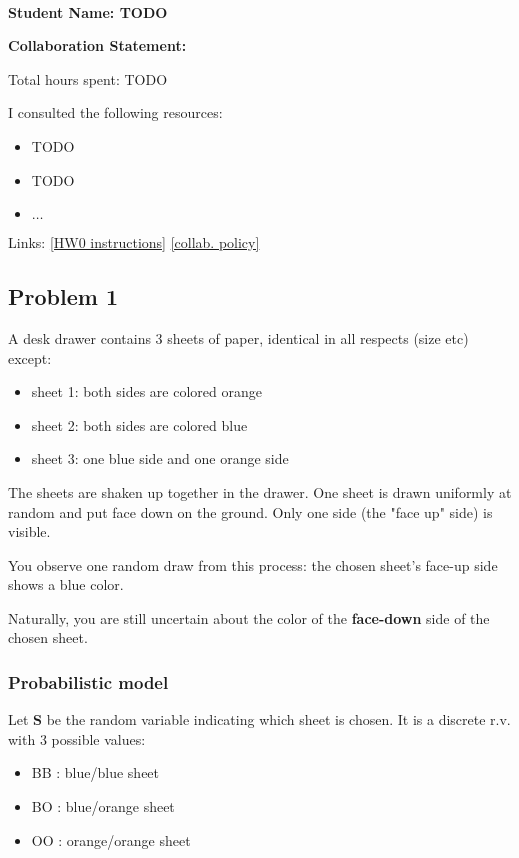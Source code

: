 \documentclass[10pt]{article}
\newcommand{\officialdirections}[1]{{\color{purple} #1}}
\begin{document}
~~\\ %

{\Large{\bf Student Name: TODO}}

\Large{\bf Collaboration Statement:}

Total hours spent: TODO

I consulted the following resources:
\begin{itemize}
\item TODO
\item TODO
\item $\ldots$	
\end{itemize}

Links: 
\href{https://www.cs.tufts.edu/cs/136/2024s/hw0.html}{[HW0 instructions]} 
\href{https://www.cs.tufts.edu/cs/136/2024s/index.html#collaboration}{[collab. policy]} 

\tableofcontents

\newpage
\officialdirections{
\subsection*{Problem 1}
A desk drawer contains 3 sheets of paper, identical in all respects (size etc) except:

\begin{itemize}
\item sheet 1: both sides are colored orange
\item sheet 2: both sides are colored blue
\item sheet 3: one blue side and one orange side
\end{itemize}

The sheets are shaken up together in the drawer. One sheet is drawn uniformly at random and put face down on the ground. Only one side (the "face up" side) is visible.

You observe one random draw from this process: the chosen sheet's face-up side shows a blue color.

Naturally, you are still uncertain about the color of the \textbf{face-down} side of the chosen sheet.
}

\subsubsection*{Probabilistic model}
Let $\boldsymbol{S}$
 be the random variable indicating which sheet is chosen. It is a discrete r.v. with 3 possible values:

\begin{itemize}
    \item BB : blue/blue sheet
    \item BO : blue/orange sheet
    \item OO : orange/orange sheet
\end{itemize}
\end{document}
